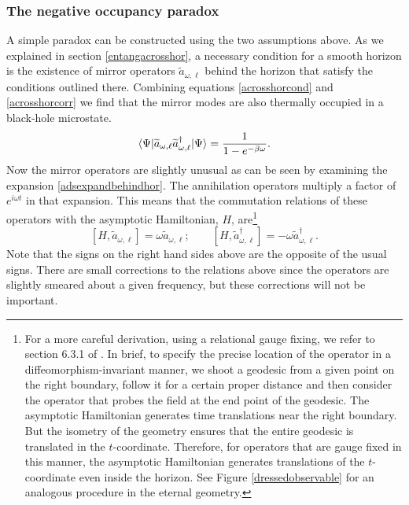 \documentclass[12pt]{article}
\newcommand{\cop}[1]{#1}
\def\ta{\widetilde{\cop{a}}}
\newcommand{\be}{\begin{equation}}
\newcommand{\ee}{\end{equation}}
\begin{document}
\subsubsection{The negative occupancy paradox}

A simple paradox can be constructed using the two assumptions above. As we explained in section \ref{entangacrosshor}, a necessary condition for a smooth horizon is the existence of mirror operators $\ta_{\omega, \ell}$ behind the horizon
that satisfy the conditions outlined there. Combining equations \eqref{acrosshorcond} and \eqref{acrosshorcorr} we find that the mirror modes are also thermally occupied in a black-hole microstate.
\be
\label{mirroroccupancy}
\langle \Psi|  \ta_{\omega, \ell} \ta^{\dagger}_{\omega, \ell} |\Psi \rangle = {1 \over 1 - e^{-\beta \omega}}.
\ee
Now the mirror operators are slightly unusual as can be seen by examining the expansion \eqref{adsexpandbehindhor}.  The annihilation operators multiply a factor of $e^{i \omega t}$ in that expansion. This means that the 
commutation relations of these operators with the asymptotic Hamiltonian, $H$,  are\footnote{For a more careful
derivation, using a relational gauge fixing, we refer to section 6.3.1 of  \cite{Papadodimas:2015xma}. In brief, to specify the precise location of the operator in a diffeomorphism-invariant manner,  we shoot a geodesic from a given point on the right boundary, follow it for a certain proper distance and then consider the operator that probes the field at the end point of  the geodesic. The asymptotic Hamiltonian generates time translations near the right boundary. But the isometry of the geometry ensures that the entire geodesic is translated in the $t$-coordinate. Therefore, for operators that are gauge fixed in this manner, the asymptotic Hamiltonian generates translations of the $t$-coordinate even inside the horizon. See Figure \ref{dressedobservable} for an analogous procedure in the eternal geometry.
}
\be
\label{commuthamilt}
[H, \ta_{\omega, \ell}] = \omega \ta_{\omega, \ell}; \qquad [H, \ta_{\omega, \ell}^{\dagger}] = -\omega \ta_{\omega, \ell}^{\dagger}.
\ee
Note that the signs on the right hand sides above are the opposite of the usual signs. There are small corrections to the relations above since the operators are slightly smeared about a given frequency, but these corrections
will not be important.
\end{document}
